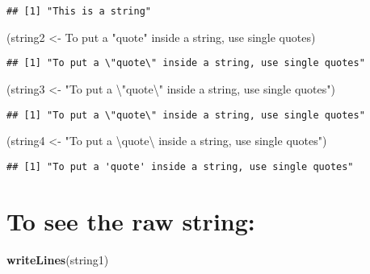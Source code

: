 \documentclass[
]{article}
\newenvironment{Shaded}{\begin{snugshade}}{\end{snugshade}}
\newcommand{\CharTok}[1]{\textcolor[rgb]{0.31,0.60,0.02}{#1}}
\newcommand{\KeywordTok}[1]{\textcolor[rgb]{0.13,0.29,0.53}{\textbf{#1}}}
\newcommand{\NormalTok}[1]{#1}
\newcommand{\StringTok}[1]{\textcolor[rgb]{0.31,0.60,0.02}{#1}}
\begin{document}
\begin{verbatim}
## [1] "This is a string"
\end{verbatim}

\begin{Shaded}
\begin{Highlighting}[]
\NormalTok{(string2 \textless{}{-}}\StringTok{ \textquotesingle{}To put a "quote" inside a string, use single quotes\textquotesingle{}}\NormalTok{)}
\end{Highlighting}
\end{Shaded}

\begin{verbatim}
## [1] "To put a \"quote\" inside a string, use single quotes"
\end{verbatim}

\begin{Shaded}
\begin{Highlighting}[]
\NormalTok{(string3 \textless{}{-}}\StringTok{ "To put a }\CharTok{\textbackslash{}"}\StringTok{quote}\CharTok{\textbackslash{}"}\StringTok{ inside a string, use single quotes"}\NormalTok{)}
\end{Highlighting}
\end{Shaded}

\begin{verbatim}
## [1] "To put a \"quote\" inside a string, use single quotes"
\end{verbatim}

\begin{Shaded}
\begin{Highlighting}[]
\NormalTok{(string4 \textless{}{-}}\StringTok{ "To put a }\CharTok{\textbackslash{}\textquotesingle{}}\StringTok{quote}\CharTok{\textbackslash{}\textquotesingle{}}\StringTok{ inside a string, use single quotes"}\NormalTok{)}
\end{Highlighting}
\end{Shaded}

\begin{verbatim}
## [1] "To put a 'quote' inside a string, use single quotes"
\end{verbatim}

\hypertarget{to-see-the-raw-string}{%
\section{To see the raw string:}\label{to-see-the-raw-string}}

\begin{Shaded}
\begin{Highlighting}[]
\KeywordTok{writeLines}\NormalTok{(string1)}
\end{Highlighting}
\end{Shaded}
\end{document}
